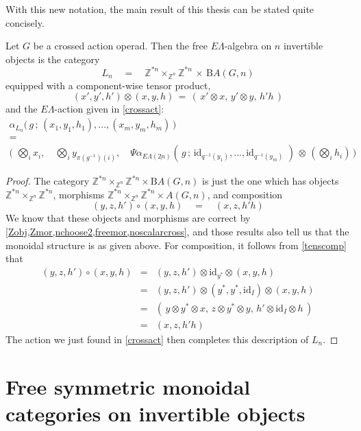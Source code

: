 \documentclass{amsbook} %
\newcommand{\ELnn}{E\Lambda(\underline{2n})}
\numberwithin{section}{chapter}
\begin{document}
With this new notation, the main result of this thesis can be stated quite concisely.

\begin{thm}\label{freeinvalgc} Let $G$ be a crossed action operad. Then the free $E\Lambda$-algebra on $n$ invertible objects is the category
\[ L_n \quad = \quad \mathbb{Z}^{\ast n} \times_{\mathbb{Z}^n} \mathbb{Z}^{\ast n}  \, \times \, \mathrm{B}A(G,n) \]
equipped with a component-wise tensor product,
\[ (x', y' ,h') \otimes (x, y, h) \, = \, ( \, x' \otimes x, \, y' \otimes y, \, h'h \, ) \]
and the $E\Lambda$-action given in \cref{crossact}:
\[ \begin{array}{c}
			\alpha_{L_n}\big( \, g \, ; \, (x_1, y_1, h_1), ..., (x_m, y_m, h_m) \, \big) \\
			= \\
			\big( \, \, \bigotimes_i x_i, \quad \bigotimes_i y_{\pi(g^{-1})(i)}, \quad \Psi \alpha_{\ELnn}( \, g \, ; \, \mathrm{id}_{q^{-1}(y_1)}, ..., \mathrm{id}_{q^{-1}(y_m)} \, \, ) \, \otimes \, (\bigotimes_i h_i) \, \big) 
		\end{array}
\]
\end{thm}
\begin{proof}
The category $\mathbb{Z}^{\ast n} \times_{\mathbb{Z}^n} \mathbb{Z}^{\ast n} \times \mathrm{B}A(G,n)$ is just the one which has objects $\mathbb{Z}^{\ast n} \times_{\mathbb{Z}^n} \mathbb{Z}^{\ast n}$, morphisms $\mathbb{Z}^{\ast n} \times_{\mathbb{Z}^n} \mathbb{Z}^{\ast n} \times A(G,n)$, and composition 
\[ (y, z , h') \circ (x, y, h) \quad = \quad (x, z, h'h) \]
We know that these objects and morphisms are correct by \cref{Zobj,Zmor,nchoose2,freemor,noscalarcross}, and those results also tell us that the monoidal structure is as given above. For composition, it follows from \cref{tenscomp} that
\[ \begin{array}{rll} 
			(y, z , h') \circ (x, y, h) & = & (y, z , h') \otimes \mathrm{id}_{y^*} \otimes (x, y, h) \\
			& = & (y, z , h') \otimes (y^*, y^*, \mathrm{id}_I) \otimes (x, y, h) \\
			& = & (\, y \otimes y^* \otimes x, \,  z \otimes y^* \otimes y, \, h' \otimes \mathrm{id}_I \otimes h \, ) \\
			& = & (x, z, h'h)
		\end{array}
\]
The action we just found in \cref{crossact} then completes this description of $L_n$.
\end{proof}

\section{Free symmetric monoidal categories on invertible objects}
\end{document}
